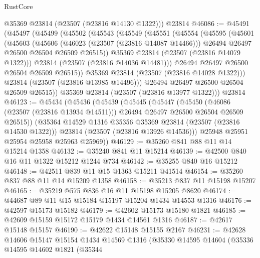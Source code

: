 \begin{lexlean}{RustCore}
\begin{coremodule}
      @35369
      @23814
      (@23507 (@23816 @14130 @1322)))
    @23814
@46086 := @45491
    (@45497
      (@45499
        (@45502
          (@45543
            (@45549
              (@45551
                (@45554
                  (@45595
                    (@45601
                      (@45603
                        (@45606
                          (@46023 (@23507 (@23816 @14087 @14466)))
                          @26494
                          @26497
                          @26500
                          @26504
                          @26509
                          @26515))
                      @35369
                      @23814
                      (@23507 (@23816 @14079 @1322)))
                    @23814
                    (@23507 (@23816 @14036 @14481)))
                  @26494
                  @26497
                  @26500
                  @26504
                  @26509
                  @26515))
              @35369
              @23814
              (@23507 (@23816 @14028 @1322)))
            @23814
            (@23507 (@23816 @13985 @14496)))
          @26494
          @26497
          @26500
          @26504
          @26509
          @26515))
      @35369
      @23814
      (@23507 (@23816 @13977 @1322)))
    @23814
@46123 := @45434
    (@45436
      (@45439
        (@45445
          (@45447
            (@45450
              (@46086 (@23507 (@23816 @13934 @14511)))
              @26494
              @26497
              @26500
              @26504
              @26509
              @26515))
          (@35364 @14529 @1316 @35356 @35369 @23814 (@23507 (@23816 @14530 @1322)))
          @23814
          (@23507 (@23816 @13926 @14536)))
        @25948
        @25951
        @25954
        @25958
        @25963
        @25969))
@46129 := @35260 @841 @88 @11 @14 @15214 @1358
@46132 := @35240 @841 @11 @15214
@46139 := @42500 @840 @16 @11 @1322 @15212 @1244 @734
@46142 := @35255 @840 @16 @15212
@46148 := @42511 @839 @11 @15 @1363 @15211 @41514
@46154 := @35260 @837 @88 @11 @14 @15209 @1358
@46158 := @35213 @837 @11 @15198 @15207
@46165 := @35219 @575 @836 @16 @11 @15198 @15205 @8620
@46174 := @44687 @89 @11 @15 @15184 @15197 @15204 @1434 @14553 @1316
@46176 := @42597 @15173 @15182
@46179 := @42602 @15173 @15180 @1821
@46185 := @42609 @15159 @15172 @15179 @1434 @14561 @1316
@46187 := @42617 @15148 @15157
@46190 := @42622 @15148 @15155 @2167
@46231 := @42628
    @14606
    @15147
    @15154
    @1434
    @14569
    @1316
    (@35330
      @14595
      @14604
      (@35336
        @14595
        @14602
        @1821
        (@35344

\end{coremodule}
\end{lexlean}
